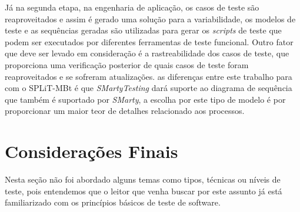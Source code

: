 Já na segunda etapa, na engenharia de aplicação, os casos de teste são reaproveitados e assim é gerado uma solução para a variabilidade, os modelos de teste e as sequências geradas são utilizadas para gerar os \textit{scripts} de teste que podem ser executados por diferentes ferramentas de teste funcional. Outro fator que deve ser levado em consideração é a rastreabilidade dos casos de teste, que proporciona uma verificação posterior de quais casos de teste foram reaproveitados e se sofreram atualizações. as diferenças entre este trabalho para com o SPLiT-MBt é que \textit{SMartyTesting} dará suporte ao diagrama de sequência que também é suportado por \textit{SMarty}, a escolha por este tipo de modelo é por proporcionar um maior teor de detalhes relacionado aos processos.

\section{Considerações Finais}
Nesta seção não foi abordado alguns temas como tipos, técnicas ou níveis de teste, pois entendemos que o leitor que venha buscar por este assunto já está familiarizado com os princípios básicos de teste de software.

